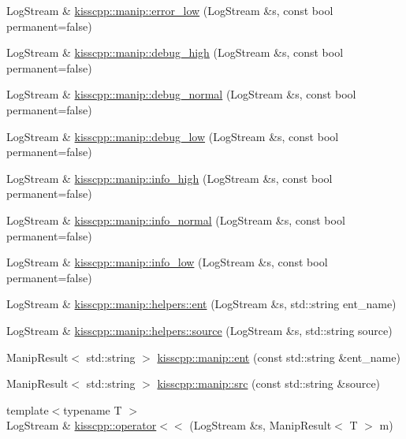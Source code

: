 \begin{DoxyCompactItemize}
\item 
Log\-Stream \& \hyperlink{a00090_ab5930b238c7e5301822bc09c41120a59}{kisscpp\-::manip\-::error\-\_\-low} (Log\-Stream \&s, const bool permanent=false)
\item 
Log\-Stream \& \hyperlink{a00090_aaf086b98ab45fa8c08557762e019afb7}{kisscpp\-::manip\-::debug\-\_\-high} (Log\-Stream \&s, const bool permanent=false)
\item 
Log\-Stream \& \hyperlink{a00090_ac4893fff26af38ff60229792840064b3}{kisscpp\-::manip\-::debug\-\_\-normal} (Log\-Stream \&s, const bool permanent=false)
\item 
Log\-Stream \& \hyperlink{a00090_a14eb82a3948c039a023b254d02e4dd01}{kisscpp\-::manip\-::debug\-\_\-low} (Log\-Stream \&s, const bool permanent=false)
\item 
Log\-Stream \& \hyperlink{a00090_a0e2079570591f8a3cc788872b65c6580}{kisscpp\-::manip\-::info\-\_\-high} (Log\-Stream \&s, const bool permanent=false)
\item 
Log\-Stream \& \hyperlink{a00090_aee465aa1a8d15e1750422696f7d3dc81}{kisscpp\-::manip\-::info\-\_\-normal} (Log\-Stream \&s, const bool permanent=false)
\item 
Log\-Stream \& \hyperlink{a00090_ae246ac6f24cae0a1452a3bb8a64f538e}{kisscpp\-::manip\-::info\-\_\-low} (Log\-Stream \&s, const bool permanent=false)
\item 
Log\-Stream \& \hyperlink{a00091_ad663c6941c8fb0937690a6468cc4b350}{kisscpp\-::manip\-::helpers\-::ent} (Log\-Stream \&s, std\-::string ent\-\_\-name)
\item 
Log\-Stream \& \hyperlink{a00091_a97784407250b5ea47c0b20441a7472e5}{kisscpp\-::manip\-::helpers\-::source} (Log\-Stream \&s, std\-::string source)
\item 
Manip\-Result$<$ std\-::string $>$ \hyperlink{a00090_afa562934b333ee12ecd3219872410a8f}{kisscpp\-::manip\-::ent} (const std\-::string \&ent\-\_\-name)
\item 
Manip\-Result$<$ std\-::string $>$ \hyperlink{a00090_a0660364105e23b9121ecf3d6d19858a5}{kisscpp\-::manip\-::src} (const std\-::string \&source)
\item 
{\footnotesize template$<$typename T $>$ }\\Log\-Stream \& \hyperlink{a00089_a7a056a2a9cc68e577ced326d1ebf86c1}{kisscpp\-::operator$<$$<$} (Log\-Stream \&s, Manip\-Result$<$ T $>$ m)
\end{DoxyCompactItemize}


